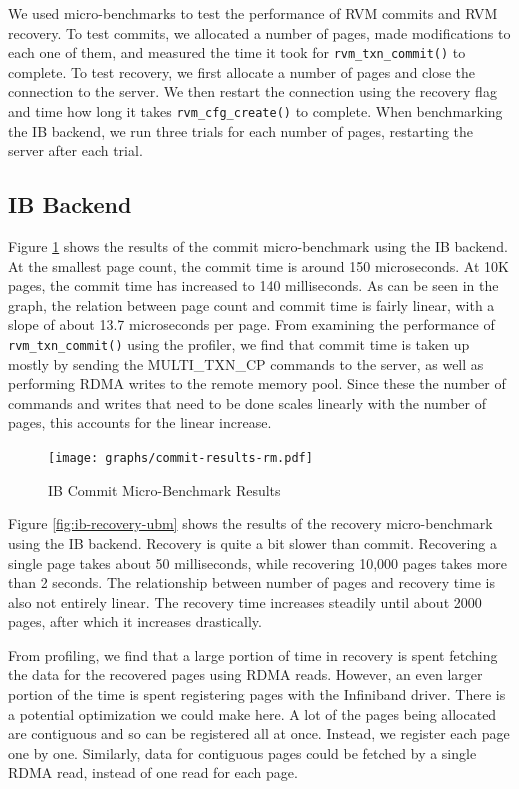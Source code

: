 We used micro-benchmarks to test the performance of RVM commits and RVM
recovery. To test commits, we allocated a number of pages, made modifications
to each one of them, and measured the time it took for \verb|rvm_txn_commit()|
to complete. To test recovery, we first allocate a number of pages and
close the connection to the server. We then restart the connection using the
recovery flag and time how long it takes \verb|rvm_cfg_create()| to complete.
When benchmarking the IB backend, we run three trials for each number of pages,
restarting the server after each trial.

\subsection{IB Backend}
Figure \ref{fig:ib-commit-ubm} shows the results of the commit micro-benchmark
using the IB backend. At the smallest page count, the commit time is around
150 microseconds. At 10K pages, the commit time has increased to 140 milliseconds.
As can be seen in the graph, the relation between page count and commit time
is fairly linear, with a slope of about 13.7 microseconds per page.
From examining the performance of \verb|rvm_txn_commit()| using the profiler,
we find that commit time is taken up mostly by sending the MULTI\_TXN\_CP
commands to the server, as well as performing RDMA writes to the remote memory pool.
Since these the number of commands and writes that need to be done scales
linearly with the number of pages, this accounts for the linear increase.

\begin{figure}[h]
    \caption{IB Commit Micro-Benchmark Results}
    \texttt{[image: graphs/commit-results-rm.pdf]}
    \label{fig:ib-commit-ubm}
\end{figure}

Figure \ref{fig:ib-recovery-ubm} shows the results of the recovery
micro-benchmark using the IB backend. Recovery is quite a bit slower than
commit. Recovering a single page takes about 50 milliseconds, while recovering
10,000 pages takes more than 2 seconds. The relationship between number of
pages and recovery time is also not entirely linear. The recovery time
increases steadily until about 2000 pages, after which it increases drastically.

From profiling, we find that a large portion of time in recovery is spent
fetching the data for the recovered pages using RDMA reads. However, an even
larger portion of the time is spent registering pages with the Infiniband
driver. There is a potential optimization we could make here. A lot of the
pages being allocated are contiguous and so can be registered all at once.
Instead, we register each page one by one. Similarly, data for contiguous
pages could be fetched by a single RDMA read, instead of one read for each page.

